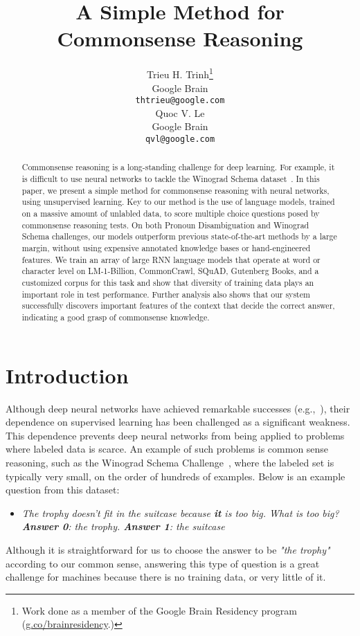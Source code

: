 \documentclass{article}
\title{A Simple Method for
    Commonsense Reasoning}
\author{
  Trieu H. Trinh\thanks{Work done as a member of the Google Brain Residency program (\url{g.co/brainresidency}.)} \\
  Google Brain\\
  \texttt{thtrieu@google.com} \\
  \And Quoc V. Le \\
  Google Brain\\
  \texttt{qvl@google.com} \\
}
\begin{document}
\maketitle

\begin{abstract}
Commonsense reasoning is a long-standing challenge for deep learning. For example, it is difficult to use neural networks to tackle the Winograd Schema dataset~\cite{levesque2011winograd}. In this paper, we present a simple method for commonsense reasoning with neural networks, using unsupervised learning. Key to our method is the use of language models, trained on a massive amount of unlabled data, to score multiple choice questions posed by commonsense reasoning tests. On both Pronoun Disambiguation and Winograd Schema challenges, our models outperform previous state-of-the-art methods by a large margin, without using expensive annotated knowledge bases or hand-engineered features. We train an array of large RNN language models that operate at word or character level on LM-1-Billion, CommonCrawl, SQuAD, Gutenberg Books, and a customized corpus for this task and show that diversity of training data plays an important role in test performance. Further analysis also shows that our system successfully discovers important features of the context that decide the correct answer, indicating a good grasp of commonsense knowledge. 


\end{abstract}

\section{Introduction}










Although deep neural networks have achieved remarkable successes  (e.g.,~\cite{krizhevsky2012imagenet,taigman2014deepface,simonyan2014very,szegedy2015going,he2015delving,he2016deep,hinton2012deep,hannun2014deep,xiong2016achieving,chiu2017state,bahdanau2014neural,sutskever2014sequence,wu2016google,hassan2018achieving}),
their dependence on supervised learning has been challenged as  a significant weakness. This dependence prevents deep neural networks from being applied to problems where labeled data is scarce.
An example of such problems is common sense reasoning, such as the Winograd Schema Challenge~\cite{levesque2011winograd}, where the labeled set is typically very small, on the order of hundreds of examples. Below is an example question from this dataset:
\begin{itemize}
\item {\it The trophy doesn’t fit in the suitcase because \textbf{it} is too big. What is too big?\\
\textbf{Answer 0}: the trophy. \textbf{Answer 1}: the suitcase\\}
\end{itemize}
Although it is straightforward for us to choose the answer to be
{\it "the trophy"} according to our common sense, answering this type of question is a great challenge for machines
because there is no training data, or very little of it.
\end{document}
